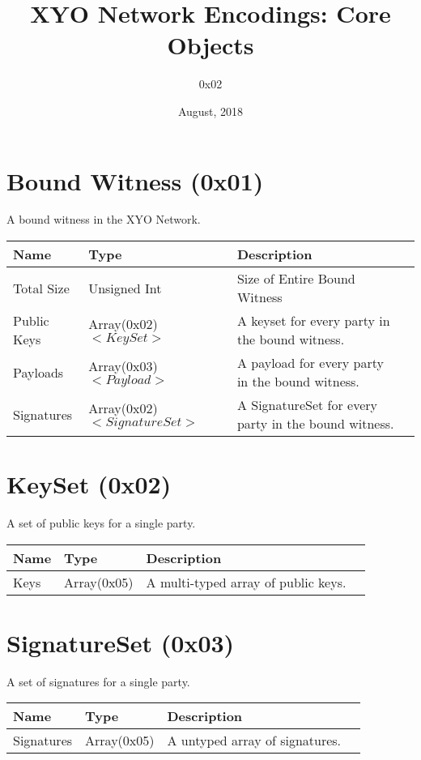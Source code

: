 \documentclass[11pt]{article}
\title{XYO Network Encodings: Core Objects}
\author{0x02}
\date{August, 2018}
\begin{document}
\maketitle

\section{Bound Witness (0x01)}
A bound witness in the XYO Network.

\begin{center}
\begin{tabular}{ |l|l|l|l| } 
\hline
\textbf{Name} & \textbf{Type} & \textbf{Description}\\
\hline
Total Size & Unsigned Int & Size of Entire Bound Witness\\  
Public Keys & Array(0x02)$<KeySet>$ & A keyset for every party in the bound witness. \\  
Payloads & Array(0x03)$<Payload>$  & A payload for every party in the bound witness.\\  
Signatures & Array(0x02)$<SignatureSet>$ & A SignatureSet for every party in the bound witness.\\  
 
\hline
\end{tabular}
\end{center}

\section{KeySet (0x02)}
A set of public keys for a single party.
\begin{center}
\begin{tabular}{ |l|l|l|l| } 
\hline
\textbf{Name} & \textbf{Type} & \textbf{Description}\\
\hline
Keys & Array(0x05) & A multi-typed array of public keys.\\  
 
\hline
\end{tabular}
\end{center}

\section{SignatureSet (0x03)}
A set of signatures for a single party.
\begin{center}
\begin{tabular}{ |l|l|l|l| } 
\hline
\textbf{Name} & \textbf{Type} & \textbf{Description}\\
\hline
Signatures & Array(0x05) & A untyped array of signatures.\\  
 
\hline
\end{tabular}
\end{center}
\end{document}
